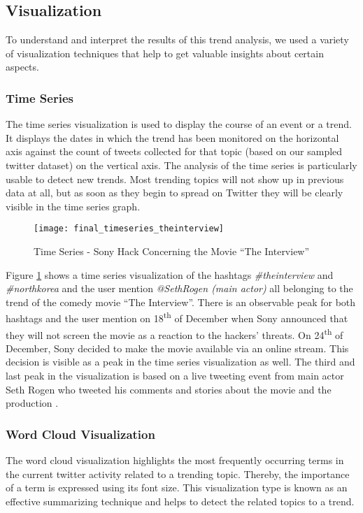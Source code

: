\subsection{Visualization}
\label{subsec:visualization}
To understand and interpret the results of this trend analysis, we used a variety of visualization techniques that help to get valuable insights about certain aspects.

\subsubsection{Time Series}
\label{subsubsec:vis-time-series}
The time series visualization is used to display the course of an event or a trend. It displays the dates in which the trend has been monitored on the horizontal axis against the count of tweets collected for that topic (based on our sampled twitter dataset) on the vertical axis. The analysis of the time series is particularly usable to detect new trends. Most trending topics will not show up in previous data at all, but as soon as they begin to spread on Twitter they will be clearly visible in the time series graph.

\begin{figure}[H]
  \centering
        \texttt{[image: final\_timeseries\_theinterview]}
  \caption[Time Series - Sony Hack Concerning the Movie \enquote{The Interview}]{Time Series - Sony Hack Concerning the Movie \enquote{The Interview}}
  \label{fig:time-series-interview}
  \vspace{-1.3em}
\end{figure}

Figure \ref{fig:time-series-interview} shows a time series visualization of the hashtags \textit{\#theinterview} and \textit{\#northkorea} and the user mention \textit{@SethRogen (main actor)} all belonging to the trend of the comedy movie \enquote{The Interview}. There is an observable peak for both hashtags and the user mention on 18\textsuperscript{th} of December when Sony announced that they will not screen the movie as a reaction to the hackers' threats. On 24\textsuperscript{th} of December, Sony decided to make the movie available via an online stream. This decision is visible as a peak in the time series visualization as well. The third and last peak in the visualization is based on a live tweeting event from main actor Seth Rogen who tweeted his comments and stories about the movie and the production \cite{deadline2014interview}.

\subsubsection{Word Cloud Visualization}
\label{subsubsec:vis-word-clouds}
The word cloud visualization highlights the most frequently occurring terms in the current twitter activity related to a trending topic. Thereby, the importance of a term is expressed using its font size. This visualization type is known as an effective summarizing technique and helps to detect the related topics to a trend.

